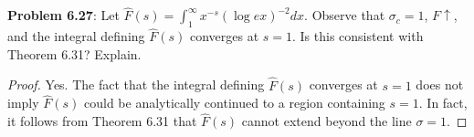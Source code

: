 \documentclass[12pt]{article}
\newcommand{\Fhat}{\widehat{F}}
\begin{document}
\fi

\textbf{Problem 6.27}: Let $\Fhat(s) = \int_1^\infty x^{-s} (\log ex)^{-2} dx$. Observe that $\sigma_c = 1$, $F \uparrow$, and the integral defining $\Fhat(s)$ converges at $s = 1$. Is this consistent with Theorem 6.31? Explain.

\begin{proof}
Yes. The fact that the integral defining $\Fhat(s)$ converges at $s = 1$ does not imply $\Fhat(s)$ could be analytically continued to a region containing $s = 1$. In fact, it follows from Theorem 6.31 that $\Fhat(s)$ cannot extend beyond the line $\sigma = 1$.
\end{proof}

\unless\ifdefined\IsMainDocument
\end{document}
